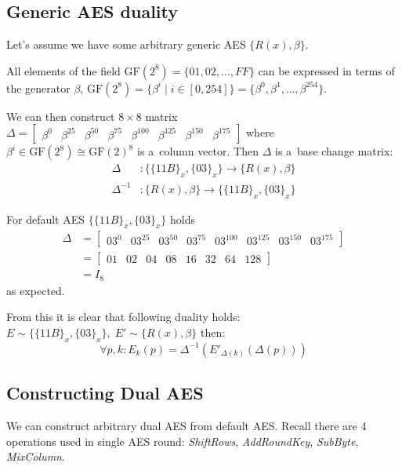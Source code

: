 \documentclass[11pt,oneside,final]{fithesis2}
\newcommand{\gfe}{\ensuremath{\text{GF}\left(2^8\right)}}
\begin{document}
	\subsection{Generic AES duality}
	Let's assume we have some arbitrary generic AES $\{R(x), \beta \}$. 

	All elements of the field $\gfe = \{01, 02, \dots, FF\}$
	can be expressed in terms of the generator $\beta$, $\gfe = \{\beta^i \; | \; i \in [0,254]\} = \{\beta^0, \beta^1, \dots, \beta^{254}\}$.

	We can then construct $8 \times 8$ matrix $\Delta = \begin{bmatrix} \beta^0 & \beta^{25} & \beta^{50} & \beta^{75} & \beta^{100} & \beta^{125} & \beta^{150} & \beta^{175}  \end{bmatrix}$ where 
	$\beta^i \in \gfe \cong \text{GF}(2)^8$ is a~column vector. Then $\Delta$ is a~base change matrix:
	\begin{subequations}
	\begin{align}
	    \Delta &: \{\{11B\}_x, \{03\}_x\}  \longrightarrow \{R(x), \beta \} \\
	    \Delta^{-1} &: \{R(x), \beta \}  \longrightarrow \{\{11B\}_x, \{03\}_x\}
	\end{align}
	\end{subequations}

	For default AES $\{\{11B\}_x, \{03\}_x\}$ holds
	\begin{align*}
	    \Delta &= \begin{bmatrix} 03^0 & 03^{25} & 03^{50} & 03^{75} & 03^{100} & 03^{125} & 03^{150} & 03^{175}  \end{bmatrix} \\
	           &= \begin{bmatrix} 01 & 02 & 04 & 08 & 16 & 32 & 64 & 128 \end{bmatrix} \\
		   &= I_8
	\end{align*}
	as expected.

	From this it is clear that following duality holds: $E \sim \{\{11B\}_x, \{03\}_x\}, \; E' \sim \{R(x), \beta \}$ then:
	\begin{equation} 
	\forall p, k: E_k(p) = \Delta^{-1}\left(E'_{\Delta(k)}(\Delta(p))\right)
	\end{equation}

	\subsection{Constructing Dual AES}
	We can construct arbitrary dual AES from default AES. Recall there are 4 operations used in single AES round: \emph{ShiftRows}, \emph{AddRoundKey}, \emph{SubByte}, \emph{MixColumn}.
\end{document}

